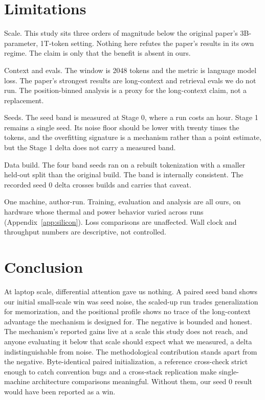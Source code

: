 \section{Limitations}
Scale. This study sits three orders of magnitude below the original
paper's 3B-parameter, 1T-token setting. Nothing here refutes the
paper's results in its own regime. The claim is only that the benefit
is absent in ours.

Context and evals. The window is 2048 tokens and the metric is language
model loss. The paper's strongest results are long-context and
retrieval evals we do not run. The position-binned analysis is a proxy
for the long-context claim, not a replacement.

Seeds. The seed band is measured at Stage 0, where a run costs an hour.
Stage 1 remains a single seed. Its noise floor should be lower with
twenty times the tokens, and the overfitting signature is a mechanism
rather than a point estimate, but the Stage 1 delta does not carry a
measured band.

Data build. The four band seeds ran on a rebuilt tokenization with a
smaller held-out split than the original build. The band is internally
consistent. The recorded seed 0 delta crosses builds and carries that
caveat.

One machine, author-run. Training, evaluation and analysis are all
ours, on hardware whose thermal and power behavior varied across runs
(Appendix~\ref{app:silicon}). Loss comparisons are unaffected. Wall
clock and throughput numbers are descriptive, not controlled.

\section{Conclusion}
At laptop scale, differential attention gave us nothing. A paired
seed band shows our initial small-scale win was seed noise, the
scaled-up run trades generalization for memorization, and the
positional profile shows no trace of the long-context advantage the
mechanism is designed for. The negative is bounded and honest. The
mechanism's reported gains live at a scale this study does not reach,
and anyone evaluating it below that scale should expect what we
measured, a delta indistinguishable from noise. The methodological
contribution stands apart from the negative. Byte-identical paired
initialization, a reference cross-check strict enough to catch
convention bugs and a cross-stack replication make single-machine
architecture comparisons meaningful. Without them, our seed 0 result
would have been reported as a win.

